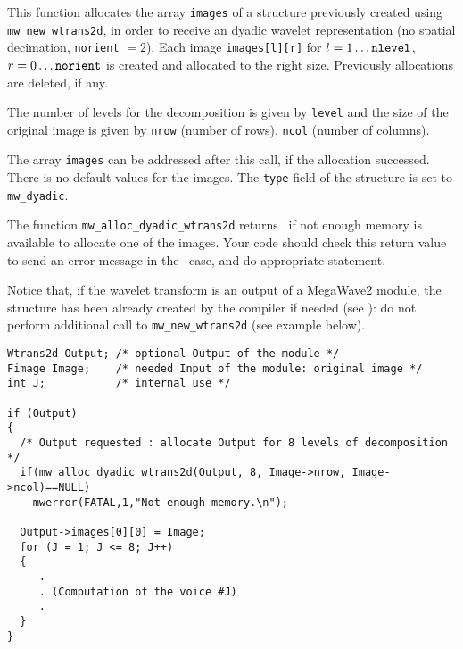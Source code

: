 \Description
This function allocates the array \verb+images+ of a \wtransdd structure previously created using \verb+mw_new_wtrans2d+, in order to receive
an dyadic wavelet representation (no spatial decimation, \verb+norient+ $=2$).
Each image \verb+images[l][r]+ for $l=1 \ldots \mbox{{\tt nlevel}}$, $r=0 \ldots \mbox{{\tt norient}}$ is created and allocated to the right size.
Previously allocations are deleted, if any.

The number of levels for the decomposition is given by \verb+level+ and the
size of the original image is given by \verb+nrow+ (number of rows), \verb+ncol+ (number of columns).

The array \verb+images+ can be addressed after this call, if the allocation successed. There is no default values for the images.
The \verb+type+ field of the \wtransdd structure is set to \verb+mw_dyadic+.

The function \verb+mw_alloc_dyadic_wtrans2d+ returns \Null\ if not enough memory is available to allocate one of the images. 
Your code should check this return value to send an error message in the \Null\ case, and do appropriate statement.

Notice that, if the wavelet transform is an output of a MegaWave2 module, the structure has been already created by the compiler if needed (see \volI): do not perform additional call to \verb+mw_new_wtrans2d+ (see example below).

\Next
\Example
\begin{verbatim}
Wtrans2d Output; /* optional Output of the module */
Fimage Image;    /* needed Input of the module: original image */
int J;           /* internal use */

if (Output) 
{
  /* Output requested : allocate Output for 8 levels of decomposition */
  if(mw_alloc_dyadic_wtrans2d(Output, 8, Image->nrow, Image->ncol)==NULL)
    mwerror(FATAL,1,"Not enough memory.\n");
  
  Output->images[0][0] = Image;
  for (J = 1; J <= 8; J++)
  {
     .
     . (Computation of the voice #J)
     .
  }
}
\end{verbatim}

\newpage %

